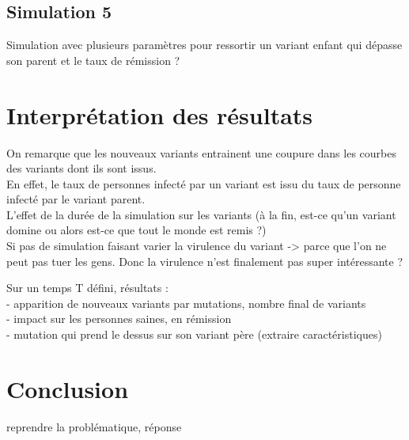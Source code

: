 \documentclass{article}
\begin{document}
\subsection{Simulation 5}

Simulation avec plusieurs paramètres pour ressortir un variant enfant qui dépasse son parent et le taux de rémission ?


\section{Interprétation des résultats}

On remarque que les nouveaux variants entrainent une coupure dans les courbes des variants dont ils sont issus. \\ 
En effet, le taux de personnes infecté par un variant est issu du taux de personne infecté par le variant parent. \\

L'effet de la durée de la simulation sur les variants (à la fin, est-ce qu'un variant domine ou alors est-ce que tout le monde est remis ?) \\

Si pas de simulation faisant varier la virulence du variant -> parce que l'on ne peut pas tuer les gens. Donc la virulence n'est finalement pas super intéressante ?

Sur un temps T défini, résultats :\\
- apparition de nouveaux variants par mutations, nombre final de variants\\
- impact sur les personnes saines, en rémission\\
- mutation qui prend le dessus sur son variant père (extraire caractéristiques)\\

\section{Conclusion}

reprendre la problématique, réponse\\
\end{document}
